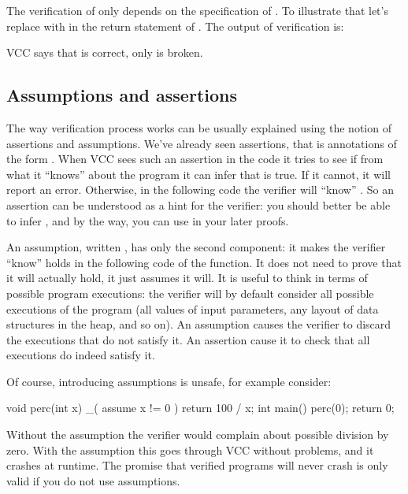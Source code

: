 The verification of  only depends on the specification of .
To illustrate that let's replace \vcc{<} with \vcc{>} in the return statement of .
The output of verification is:


\noindent
VCC says that  is correct, only  is broken.

\subsection{Assumptions and assertions}

The way verification process works can be usually explained using the
notion of assertions and assumptions.
We've already seen assertions, that is annotations of the form .
When VCC sees such an assertion in the code
it tries to see if from what it ``knows'' about the program it can infer
that  is true.
If it cannot, it will report an error.
Otherwise, in the following code the verifier will ``know'' .
So an assertion can be understood as a hint for the verifier:
you should better be able to infer , and by the way, you can use
 in your later proofs.

An assumption, written , has only the second component:
it makes the verifier ``know''  holds in the following code of the function.
It does not need to prove that it will actually hold, it just assumes it will.
It is useful to think in terms of possible program executions: the verifier
will by default consider all possible executions of the program (\eg all values
of input parameters, any layout of data structures in the heap, and so on).
An assumption causes the verifier to discard the executions that do not satisfy it.
An assertion cause it to check that all executions do indeed satisfy it.

Of course, introducing assumptions is unsafe, for example consider:

\begin{VCC}
void perc(int x) {
  _( assume x != 0 )
  return 100 / x;
}
int main()
{
  perc(0);
  return 0;
}
\end{VCC}

\noindent
Without the assumption the verifier would complain about possible division by zero.
With the assumption this goes through VCC without problems, and it crashes at runtime.
The promise that verified programs will never crash is only valid if you do not
use assumptions.

